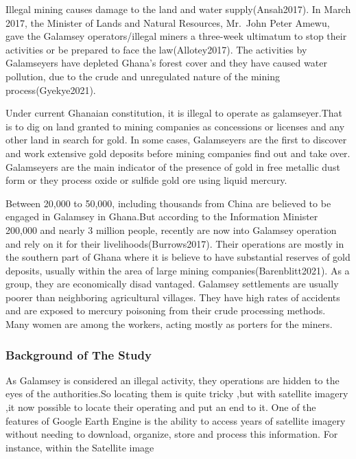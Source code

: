 \documentclass[
  letterpaper,
  DIV=11,
  numbers=noendperiod]{scrartcl}
\begin{document}
Illegal mining causes damage to the land and water supply(Ansah2017). In
March 2017, the Minister of Lands and Natural Resources, Mr.~John Peter
Amewu, gave the Galamsey operators/illegal miners a three-week ultimatum
to stop their activities or be prepared to face the law(Allotey2017).
The activities by Galamseyers have depleted Ghana's forest cover and
they have caused water pollution, due to the crude and unregulated
nature of the mining process(Gyekye2021).

Under current Ghanaian constitution, it is illegal to operate as
galamseyer.That is to dig on land granted to mining companies as
concessions or licenses and any other land in search for gold. In some
cases, Galamseyers are the first to discover and work extensive gold
deposits before mining companies find out and take over. Galamseyers are
the main indicator of the presence of gold in free metallic dust form or
they process oxide or sulfide gold ore using liquid mercury.

Between 20,000 to 50,000, including thousands from China are believed to
be engaged in Galamsey in Ghana.But according to the Information
Minister 200,000 and nearly 3 million people, recently are now into
Galamsey operation and rely on it for their livelihoods(Burrows2017).
Their operations are mostly in the southern part of Ghana where it is
believe to have substantial reserves of gold deposits, usually within
the area of large mining companies(Barenblitt2021). As a group, they are
economically disad vantaged. Galamsey settlements are usually poorer
than neighboring agricultural villages. They have high rates of
accidents and are exposed to mercury poisoning from their crude
processing methods. Many women are among the workers, acting mostly as
porters for the miners.

\hypertarget{background-of-the-study}{%
\subsubsection{Background of The Study}\label{background-of-the-study}}

As Galamsey is considered an illegal activity, they operations are
hidden to the eyes of the authorities.So locating them is quite tricky
,but with satellite imagery ,it now possible to locate their operating
and put an end to it. One of the features of Google Earth Engine is the
ability to access years of satellite imagery without needing to
download, organize, store and process this information. For instance,
within the Satellite image
\end{document}
